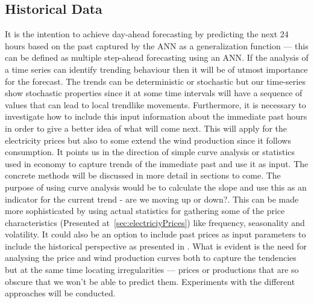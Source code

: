 \subsection{Historical Data}
\label{sec:historicalData}
It is the intention to achieve day-ahead forecasting by predicting the next 24 hours based on the past captured by the ANN as a generalization function  --- this can be defined as multiple step-ahead forecasting using an ANN\cite[Chapter~7.1.6]{econometrics}. 
If the analysis of a time series can identify trending behaviour then it will be of utmost importance for the forecast. The trends can be deterministic or stochastic but our time-series show stochastic properties since it at some time intervals will have a sequence of values that can lead to local trendlike movements\cite[Chapter~7.3]{econometrics}. Furthermore, it is necessary to investigate how to include this input information about the immediate past hours in order to give a better idea of what will come next. This will apply for the electricity prices but also to some extend the wind production since it follows consumption. It points us in the direction of simple curve analysis or statistics used in economy to capture trends of the immediate past and use it as input. The concrete methods will be discussed in more detail in sections to come. The purpose of using curve analysis would be to calculate the slope and use this as an indicator for the current trend - are we moving up or down?. This can be made more sophisticated by using actual statistics for gathering some of the price characteristics (Presented at~\ref{sec:electriciyPrices}) like frequency, seasonality and volatility. It could also be an option to include past prices as input parameters to include the historical perspective as presented in \cite{singhal2011electricity}.
What is evident is the need for analysing the price and wind production curves both to capture the tendencies but at the same time locating irregularities --- prices or productions that are so obscure that we won't be able to predict them. Experiments with the different approaches will be conducted.
